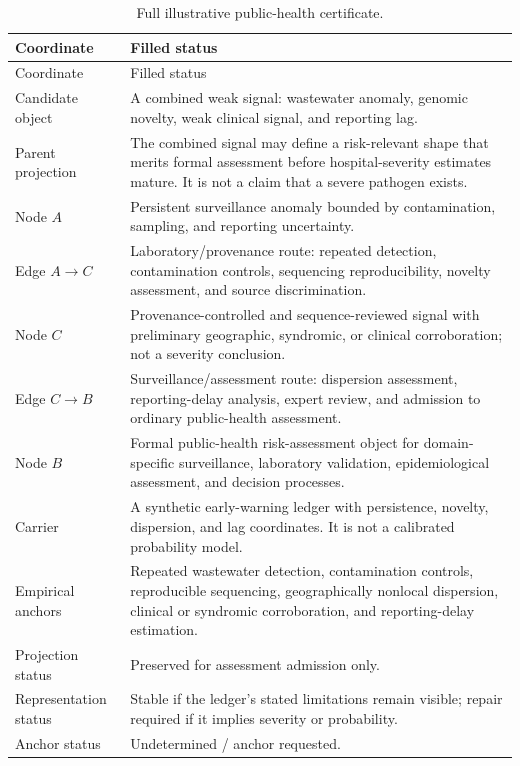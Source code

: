 \documentclass[10pt]{article}
\begin{document}
\begin{longtable}{@{}p{}p{}@{}}
\caption{Full illustrative public-health certificate.}\label{tab:ph-full}\\
\toprule
Coordinate & Filled status \\
\midrule
\endfirsthead
\toprule
Coordinate & Filled status \\
\midrule
\endhead
\bottomrule
\endfoot
Candidate object & A combined weak signal: wastewater anomaly, genomic novelty, weak clinical signal, and reporting lag. \\
Parent projection & The combined signal may define a risk-relevant shape that merits formal assessment before hospital-severity estimates mature. It is not a claim that a severe pathogen exists. \\
Node $A$ & Persistent surveillance anomaly bounded by contamination, sampling, and reporting uncertainty. \\
Edge $A\rightarrow C$ & Laboratory/provenance route: repeated detection, contamination controls, sequencing reproducibility, novelty assessment, and source discrimination. \\
Node $C$ & Provenance-controlled and sequence-reviewed signal with preliminary geographic, syndromic, or clinical corroboration; not a severity conclusion. \\
Edge $C\rightarrow B$ & Surveillance/assessment route: dispersion assessment, reporting-delay analysis, expert review, and admission to ordinary public-health assessment. \\
Node $B$ & Formal public-health risk-assessment object for domain-specific surveillance, laboratory validation, epidemiological assessment, and decision processes. \\
Carrier & A synthetic early-warning ledger with persistence, novelty, dispersion, and lag coordinates. It is not a calibrated probability model. \\
Empirical anchors & Repeated wastewater detection, contamination controls, reproducible sequencing, geographically nonlocal dispersion, clinical or syndromic corroboration, and reporting-delay estimation. \\
Projection status & Preserved for assessment admission only. \\
Representation status & Stable if the ledger's stated limitations remain visible; repair required if it implies severity or probability. \\
Anchor status & Undetermined / anchor requested. \\

\end{longtable}
\end{document}
